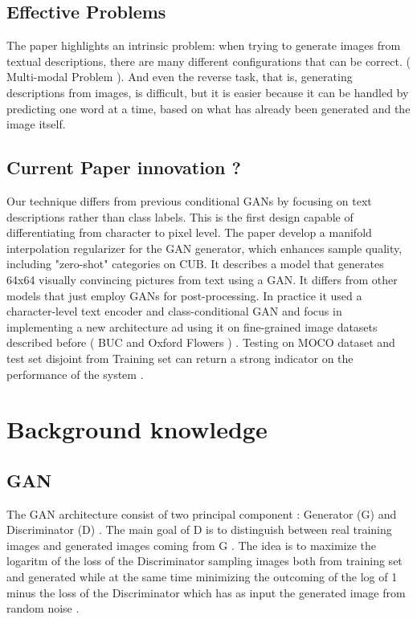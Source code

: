 \subsection*{Effective Problems}
The paper highlights an intrinsic problem: when trying to generate images from textual descriptions, 
there are many different configurations that can be correct. ( Multi-modal Problem ). 
And even the reverse task, that is, generating descriptions from images, is difficult, 
but it is easier because it can be handled by predicting one word at a time, 
based on what has already been generated and the image itself.

\subsection*{Current Paper innovation ? }
Our technique differs from previous conditional GANs by focusing on text descriptions rather than class labels. 
This is the first design capable of differentiating from character to pixel level. 
The paper develop a manifold interpolation regularizer for the GAN generator, 
which enhances sample quality, including "zero-shot" categories on CUB.
It describes a model that generates 64x64 visually convincing pictures from text using a GAN. 
It differs from other models that just employ GANs for post-processing.
In practice it used a character-level text encoder and class-conditional GAN and 
focus in implementing a new architecture ad using it on fine-grained  
image datasets described before ( BUC and Oxford Flowers ) .
Testing on MOCO dataset and test set disjoint from Training set 
can return a strong indicator on the performance of the system .

\section*{Background knowledge}

\subsection*{
    GAN
}
The GAN architecture consist of two principal component :
Generator (G) and Discriminator (D) .
The main goal of D is to distinguish between real training images and generated images coming 
from G .
The idea is to maximize the logaritm of the loss of the Discriminator sampling images both from training set and 
generated while at the same time minimizing the outcoming of the log of 1 minus the loss of the Discriminator which has 
as input the generated image from random noise .

